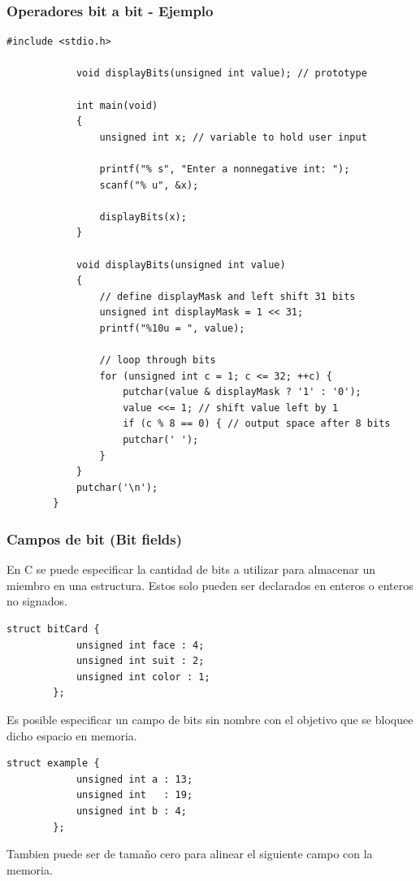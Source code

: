 \documentclass[10.5pt,scale=1.0,t,aspectratio=169,hyperref={pdfpagelabels=false}]{beamer}
\begin{document}
\begin{frame}[fragile]
	\frametitle{Operadores bit a bit - Ejemplo}
		\begin{lstlisting}[style=CStyle,basicstyle=\tiny]
			#include <stdio.h>
			
			void displayBits(unsigned int value); // prototype
			
			int main(void)
			{
				unsigned int x; // variable to hold user input
				
				printf("% s", "Enter a nonnegative int: ");
				scanf("% u", &x);
				
				displayBits(x);
			}
			
			void displayBits(unsigned int value)
			{
				// define displayMask and left shift 31 bits
				unsigned int displayMask = 1 << 31;
				printf("%10u = ", value);
				
				// loop through bits
				for (unsigned int c = 1; c <= 32; ++c) {
					putchar(value & displayMask ? '1' : '0');
					value <<= 1; // shift value left by 1
					if (c % 8 == 0) { // output space after 8 bits
					putchar(' ');
				}
			}
			putchar('\n');
		}
		\end{lstlisting}
\end{frame}
\begin{frame}[fragile]
	\frametitle{Campos de bit (Bit fields)}
	En C se puede especificar la cantidad de bits a utilizar para almacenar un miembro en una estructura. Estos solo pueden ser declarados en enteros o enteros no signados. 
	\begin{lstlisting}[style=CStyle,basicstyle=\tiny]
		struct bitCard {
			unsigned int face : 4;
			unsigned int suit : 2;
			unsigned int color : 1;
		};
	\end{lstlisting}	
	Es posible especificar un campo de bits sin nombre con el objetivo que se bloquee dicho espacio en memoria.
	\begin{lstlisting}[style=CStyle,basicstyle=\tiny]
		struct example {
			unsigned int a : 13;
			unsigned int   : 19;
			unsigned int b : 4;
		};
	\end{lstlisting}
	Tambien puede ser de tama\~no cero para alinear el siguiente campo con la memoria.
\end{frame}
\end{document}
